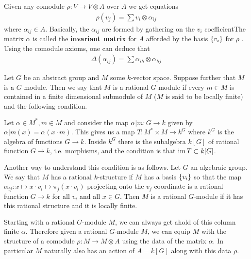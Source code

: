 \documentclass[12pt]{article}
\begin{document}
\begin{definition}
    Given any comodule $\rho:V\to V\otimes A$ over $A$ we get equations \begin{align}
    \rho(v_j) = \sum v_i\otimes \alpha_{ij}
\end{align} where $\alpha_{ij}\in A$. Basically, the $\alpha_{ij}$ are formed by gathering on the $v_i$ coefficientThe matrix $\alpha$ is called the \textbf{invariant matrix} for $A$ afforded by the basis $\{v_i\}$ for $\rho$ . Using the comodule axioms, one can deduce that \begin{align*}
    \Delta(\alpha_{ij}) = \sum \alpha_{ih}\otimes\alpha_{hj}
\end{align*}
\end{definition}

\begin{definition}
    Let $G$ be an abstract group and $M$ some $k$-vector space. Suppose further that $M$ is a $G$-module. Then we say that $M$ is a rational $G$-module if every $m\in M$ is contained in a finite dimensional submodule of $M$ ($M$ is said to be locally finite) and the following condition.

\hfill 

Let $\alpha\in M^*, m\in M$ and consider the map $\alpha\vert m:G\to k$ given by $\alpha\vert m(x) = \alpha(x\cdot m)$. This gives us a map $T:M^*\times M\to k^G$ where $k^G$ is the algebra of functions $G\to k$. Inside $k^G$ there is the subalgebra $k[G]$ of rational function $G\to k$, i.e. morphisms, and the condition is that $\operatorname{im} T \subset k[G]$.

\hfill

Another way to understand this condition is as follows. Let $G$ an algebraic group. We say that $M$ has a rational $k$-structure if $M$ has a basis $\{v_i\}$ so that the map $\alpha_{ij}:x\mapsto x\cdot v_i \mapsto \pi_j(x\cdot v_i)$ projecting onto the $v_j$ coordinate is a rational function $G\to k$ for all $v_i$ and all $x\in G$. Then $M$ is a rational $G$-module if it has this rational structure and it is locally finite. 
\end{definition}
\begin{remark}
    Starting with a rational $G$-module $M$, we can always get ahold of this column finite $\alpha$. Therefore given a rational $G$-module $M$, we can equip $M$ with the structure of a comodule $\rho:M\to M\otimes A$ using the data of the matrix $\alpha$. In particular $M$ naturally also has an action of $A = k[G]$ along with this data $\rho$.
\end{remark}
\end{document}

